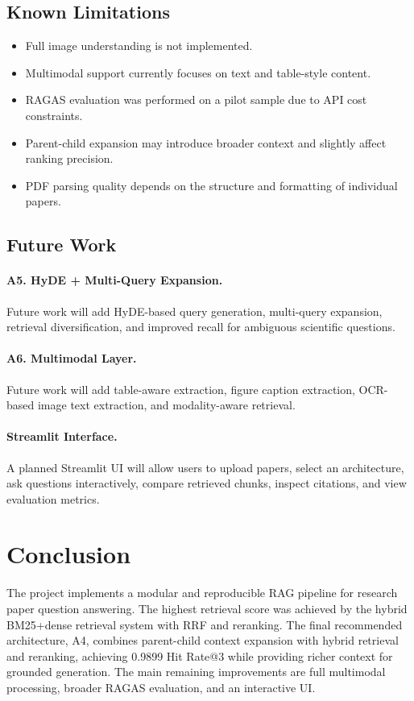 \documentclass[11pt]{article}
\begin{document}
\subsection{Known Limitations}
\begin{itemize}
    \item Full image understanding is not implemented.
    \item Multimodal support currently focuses on text and table-style content.
    \item RAGAS evaluation was performed on a pilot sample due to API cost constraints.
    \item Parent-child expansion may introduce broader context and slightly affect ranking precision.
    \item PDF parsing quality depends on the structure and formatting of individual papers.
\end{itemize}

\subsection{Future Work}
\paragraph{A5. HyDE + Multi-Query Expansion.}
Future work will add HyDE-based query generation, multi-query expansion, retrieval diversification, and improved recall for ambiguous scientific questions.

\paragraph{A6. Multimodal Layer.}
Future work will add table-aware extraction, figure caption extraction, OCR-based image text extraction, and modality-aware retrieval.

\paragraph{Streamlit Interface.}
A planned Streamlit UI will allow users to upload papers, select an architecture, ask questions interactively, compare retrieved chunks, inspect citations, and view evaluation metrics.

\section{Conclusion}
The project implements a modular and reproducible RAG pipeline for research paper question answering. The highest retrieval score was achieved by the hybrid BM25+dense retrieval system with RRF and reranking. The final recommended architecture, A4, combines parent-child context expansion with hybrid retrieval and reranking, achieving 0.9899 Hit Rate@3 while providing richer context for grounded generation. The main remaining improvements are full multimodal processing, broader RAGAS evaluation, and an interactive UI.
\end{document}
